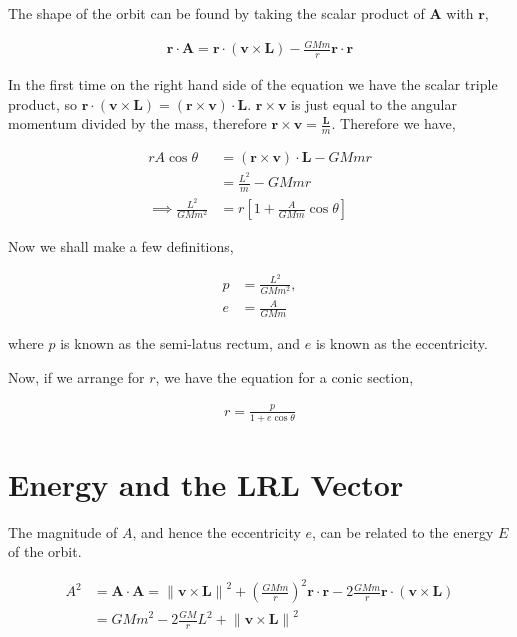\documentclass[11pt]{amsart}
\begin{document}
The shape of the orbit can be found by taking the scalar product of $\mathbf{A}$ with $\mathbf{r}$,

\begin{align*}
  \mathbf{r}\cdot\mathbf{A} = \mathbf{r}\cdot\left(\mathbf{v}\times\mathbf{L}\right) - \frac{GMm}{r}\mathbf{r}\cdot\mathbf{r}
\end{align*}

In the first time on the right hand side of the equation we have the scalar triple product, so $\mathbf{r}\cdot\left(\mathbf{v}\times\mathbf{L}\right) = \left(\mathbf{r}\times\mathbf{v}\right)\cdot\mathbf{L}$. $\mathbf{r}\times\mathbf{v}$ is just equal to the angular momentum divided by the mass, therefore $\mathbf{r}\times\mathbf{v} = \frac{\mathbf{L}}{m}$. Therefore we have,

\begin{align*}
  rA\cos{\theta} &= \left(\mathbf{r}\times\mathbf{v}\right)\cdot\mathbf{L} - GMmr \\
                 &= \frac{L^2}{m} - GMmr \\
  \implies \frac{L^2}{GMm^2} &= r\left[1 + \frac{A}{GMm}\cos{\theta}\right]
\end{align*}

Now we shall make a few definitions,

\begin{align*}
  p &= \frac{L^2}{GMm^2}, \\
  e &= \frac{A}{GMm}
\end{align*}

where $p$ is known as the semi-latus rectum, and $e$ is known as the eccentricity.

Now, if we arrange for $r$, we have the equation for a conic section,

\begin{align*}
  r = \frac{p}{1 + e\cos{\theta}}
\end{align*}

\section{Energy and the LRL Vector}

The magnitude of $A$, and hence the eccentricity $e$, can be related to the energy $E$ of the orbit.

\begin{align*}
  A^2 &= \mathbf{A}\cdot\mathbf{A} = {\|\mathbf{v}\times\mathbf{L}\|}^2 + {\left(\frac{GMm}{r}\right)}^2 \mathbf{r}\cdot\mathbf{r} - 2\frac{GMm}{r} \mathbf{r}\cdot\left(\mathbf{v}\times\mathbf{L}\right) \\
      &= {GMm}^2 - 2\frac{GM}{r} L^2 + {\|\mathbf{v}\times\mathbf{L}\|}^2
\end{align*}
\end{document}
